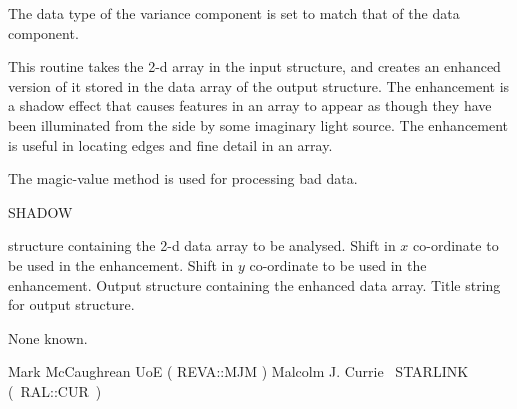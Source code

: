 {{{{         \sstitem
         The data type of the variance component is set to match that of
         the data component.
      }
   }
}

\begin{manroutinedescription}
  This routine takes the 2-d array in the input {} structure,
  and creates an enhanced version of it stored in the data array of the
  output {} structure. The enhancement is a shadow effect that
  causes features in an array to appear as though they have been
  illuminated from the side by some imaginary light source. The
  enhancement is useful in locating edges and fine detail in an
  array.

  The magic-value method is used for processing bad data.

  SHADOW

\newpage
{}
\begin{manparametertable}
  {} structure containing the 2-d data array to be analysed.
  Shift in {$x$} co-ordinate to be used in the enhancement. {\mantt [1.0]}
  Shift in {$y$} co-ordinate to be used in the enhancement. {\mantt [1.0]}
  Output {} structure containing the enhanced data array.
  Title string for output {} structure.
 \mbox{{}}
\end{manparametertable}
  None known.

  Mark McCaughrean UoE ( {\mantt REVA}::{\mantt MJM} )
  Malcolm J. Currie ~STARLINK \mbox{( {\mantt RAL}::{\mantt CUR} )}
\end{manroutinedescription}

}
